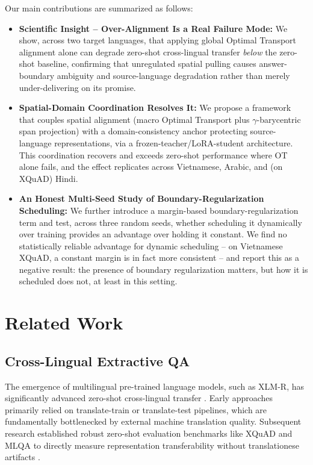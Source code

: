 \documentclass[11pt]{article}
\begin{document}
Our main contributions are summarized as follows:
\begin{itemize}
    \item \textbf{Scientific Insight -- Over-Alignment Is a Real Failure Mode:} We show, across two target languages, that applying global Optimal Transport alignment alone can degrade zero-shot cross-lingual transfer \emph{below} the zero-shot baseline, confirming that unregulated spatial pulling causes answer-boundary ambiguity and source-language degradation rather than merely under-delivering on its promise.
    \item \textbf{Spatial-Domain Coordination Resolves It:} We propose a framework that couples spatial alignment (macro Optimal Transport plus $\gamma$-barycentric span projection) with a domain-consistency anchor protecting source-language representations, via a frozen-teacher/LoRA-student architecture. This coordination recovers and exceeds zero-shot performance where OT alone fails, and the effect replicates across Vietnamese, Arabic, and (on XQuAD) Hindi.
    \item \textbf{An Honest Multi-Seed Study of Boundary-Regularization Scheduling:} We further introduce a margin-based boundary-regularization term and test, across three random seeds, whether scheduling it dynamically over training provides an advantage over holding it constant. We find no statistically reliable advantage for dynamic scheduling -- on Vietnamese XQuAD, a constant margin is in fact more consistent -- and report this as a negative result: the presence of boundary regularization matters, but how it is scheduled does not, at least in this setting.
\end{itemize}

\section{Related Work}

\subsection{Cross-Lingual Extractive QA}
The emergence of multilingual pre-trained language models, such as XLM-R, has significantly advanced zero-shot cross-lingual transfer \cite{conneau-etal-2020-unsupervised}. Early approaches primarily relied on translate-train or translate-test pipelines, which are fundamentally bottlenecked by external machine translation quality. Subsequent research established robust zero-shot evaluation benchmarks like XQuAD and MLQA to directly measure representation transferability without translationese artifacts \cite{artetxe-etal-2020-cross, lewis-etal-2020-mlqa}. 
\end{document}

